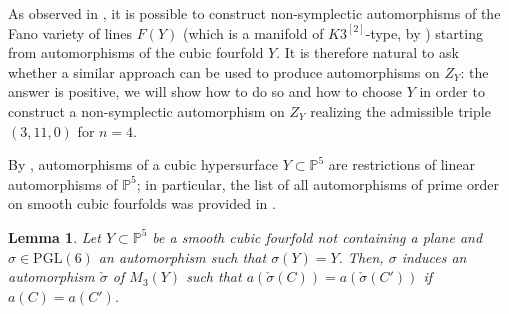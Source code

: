 \documentclass{amsart}
\newtheorem{lemma}[theorem]{Lemma}
\theoremstyle{definition}
\newcommand{\hsk}{K3^{\left[2\right]}}
\begin{document}
As observed in \cite[\S 6.2]{bcs}, it is possible to construct non-symplectic automorphisms of the Fano variety of lines $F(Y)$ (which is a manifold of $\hsk$-type, by \cite{beauv_donagi}) starting from automorphisms of the cubic fourfold $Y$. It is therefore natural to ask whether a similar approach can be used to produce automorphisms on $Z_Y$: the answer is positive, we will show how to do so and how to choose $Y$ in order to construct a non-symplectic automorphism on $Z_Y$ realizing the admissible triple $(3,11,0)$ for $n=4$.

By \cite{matsum_monsky}, automorphisms of a cubic hypersurface $Y \subset \mathbb{P}^5$ are restrictions of linear automorphisms of $\mathbb{P}^5$; in particular, the list of all automorphisms of prime order on smooth cubic fourfolds was provided in \cite[Theorem 3.8]{gonzalez_liendo}. 

\begin{lemma}\label{lemma: discesa autom llsvs}
 Let $Y \subset \mathbb{P}^5$ be a smooth cubic fourfold not containing a plane and \mbox{$\sigma \in \mathrm{PGL}(6)$} an automorphism such that $\sigma(Y) = Y$. Then, $\sigma$ induces an automorphism $\check{\sigma}$ of $M_3(Y)$ such that $a(\check{\sigma}(C)) = a(\check{\sigma}(C'))$ if $a(C) = a(C')$.
\end{lemma}
\end{document}
